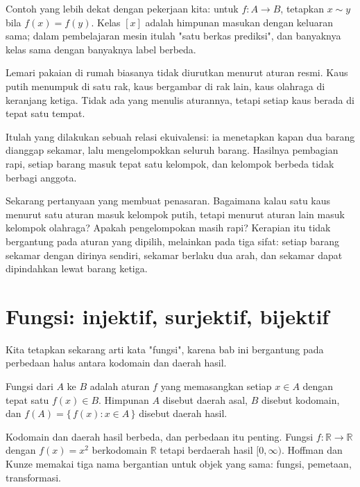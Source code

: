 Contoh yang lebih dekat dengan pekerjaan kita: untuk $f : A \to B$, tetapkan
$x \sim y$ bila $f(x) = f(y)$. Kelas $[x]$ adalah himpunan masukan dengan keluaran sama;
dalam pembelajaran mesin itulah "satu berkas prediksi", dan banyaknya kelas sama dengan
banyaknya label berbeda.

\begin{untukanak}
Lemari pakaian di rumah biasanya tidak diurutkan menurut aturan resmi. Kaus putih
menumpuk di satu rak, kaus bergambar di rak lain, kaus olahraga di keranjang ketiga.
Tidak ada yang menulis aturannya, tetapi setiap kaus berada di tepat satu tempat.

Itulah yang dilakukan sebuah relasi ekuivalensi: ia menetapkan kapan dua barang
dianggap sekamar, lalu mengelompokkan seluruh barang. Hasilnya pembagian rapi, setiap
barang masuk tepat satu kelompok, dan kelompok berbeda tidak berbagi anggota.

Sekarang pertanyaan yang membuat penasaran. Bagaimana kalau satu kaus menurut satu
aturan masuk kelompok putih, tetapi menurut aturan lain masuk kelompok olahraga? Apakah
pengelompokan masih rapi? Kerapian itu tidak bergantung pada aturan yang dipilih,
melainkan pada tiga sifat: setiap barang sekamar dengan dirinya sendiri, sekamar
berlaku dua arah, dan sekamar dapat dipindahkan lewat barang ketiga.
\end{untukanak}

\section{Fungsi: injektif, surjektif, bijektif}

Kita tetapkan sekarang arti kata "fungsi", karena bab ini bergantung pada perbedaan
halus antara kodomain dan daerah hasil.

\begin{definisi}[Fungsi]
Fungsi dari $A$ ke $B$ adalah aturan $f$ yang memasangkan setiap $x \in A$ dengan
tepat satu $f(x) \in B$. Himpunan $A$ disebut daerah asal, $B$ disebut kodomain, dan
$f(A) = \{\, f(x) : x \in A \,\}$ disebut daerah hasil.
\end{definisi}

Kodomain dan daerah hasil berbeda, dan perbedaan itu penting. Fungsi
$f : \mathbb{R} \to \mathbb{R}$ dengan $f(x) = x^{2}$ berkodomain $\mathbb{R}$ tetapi
berdaerah hasil $[0,\infty)$. Hoffman dan Kunze memakai tiga nama bergantian untuk
objek yang sama: fungsi, pemetaan, transformasi.

